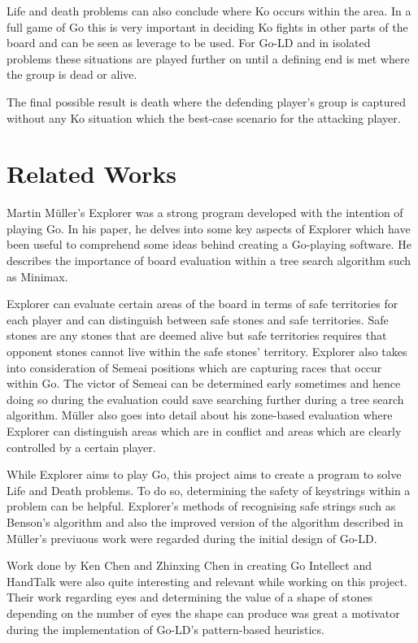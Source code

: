 \documentclass{l4proj}
\begin{document}
Life and death problems can also conclude where Ko occurs within the area. In a full game of Go this is very important in deciding Ko fights in other parts of the board and can be seen as leverage to be used.  For Go-LD and in isolated problems these situations are played further on until a defining end is met where the group is dead or alive.

The final possible result is death where the defending player’s group is captured without any Ko situation which the best-case scenario for the attacking player.

\section{Related Works}

Martin Müller's Explorer \citep{Muller2002} was a strong program developed with the intention of playing Go. In his paper, he delves into some key aspects of Explorer which have been useful to comprehend some ideas behind creating a Go-playing software. He describes the importance of board evaluation within a tree search algorithm such as Minimax.

Explorer can evaluate certain areas of the board in terms of safe territories for each player and can distinguish between safe stones and safe territories. Safe stones are any stones that are deemed alive but safe territories requires that opponent stones cannot live within the safe stones' territory. Explorer also takes into consideration of Semeai positions which are capturing races that occur within Go. The victor of Semeai can be determined early sometimes and hence doing so during the evaluation could save searching further during a tree search algorithm. Müller also goes into detail about his zone-based evaluation where Explorer can distinguish areas which are in conflict and areas which are clearly controlled by a certain player.

While Explorer aims to play Go, this project aims to create a program to solve Life and Death problems. To do so, determining the safety of keystrings within a problem can be helpful. Explorer's methods of recognising safe strings such as Benson's algorithm \citep{Benson1976} and also the improved version of the algorithm described in Müller's previuous work \citep{Muller1998} were regarded during the initial design of Go-LD.

Work done by Ken Chen and Zhinxing Chen \citep{Chen1999} in creating Go Intellect and HandTalk were also quite interesting and relevant while working on this project. Their work regarding eyes and determining the value of a shape of stones depending on the number of eyes the shape can produce was great a motivator during the implementation of Go-LD's pattern-based heuristics.
\end{document}
